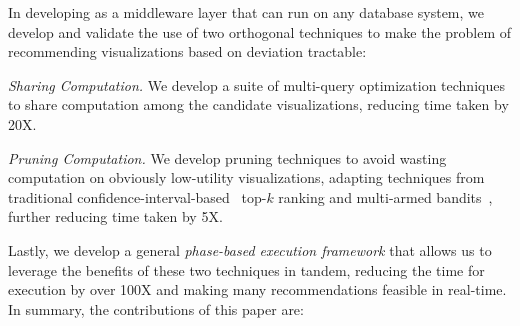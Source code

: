 In developing \SeeDB as a middleware layer that can run on any database system,
we develop and validate the use of  
two orthogonal techniques to make the problem of recommending visualizations based on deviation tractable:
\begin{denselist}
\item {\em Sharing Computation.} 
We develop a suite of multi-query optimization techniques to share computation
among the candidate visualizations,
reducing time taken by 20X.
\item {\em Pruning Computation.}
We develop pruning techniques to avoid wasting computation
on obviously low-utility visualizations, adapting
techniques from traditional 
  confidence-interval-based~\cite{hoeffding1963probability} 
  top-$k$ ranking and
  multi-armed bandits~\cite{bandits},
  further reducing time taken by 5X.
\end{denselist}
Lastly, we develop a general {\em phase-based execution framework}
that allows us to leverage the benefits of these two techniques
in tandem, reducing the time for execution by over 100X and
making many recommendations feasible in real-time.
In summary, the contributions of this paper are:

